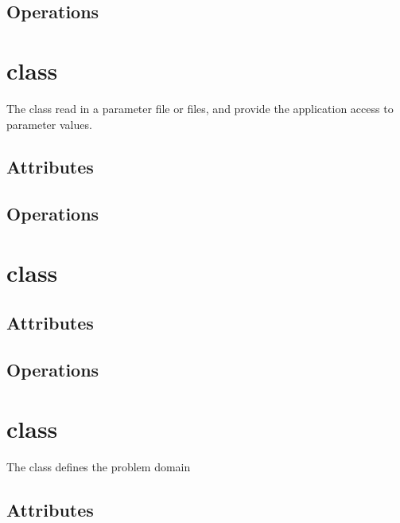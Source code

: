 \documentclass{book}
\begin{document}
\subsection{Operations}

\section{ class}

The  class read in a parameter file or files, and
provide the application access to parameter values.


\subsection{Attributes}

\subsection{Operations}

\section{ class}


\subsection{Attributes}

\subsection{Operations}

\section{ class}

The  class defines the problem domain


\subsection{Attributes}
\end{document}
